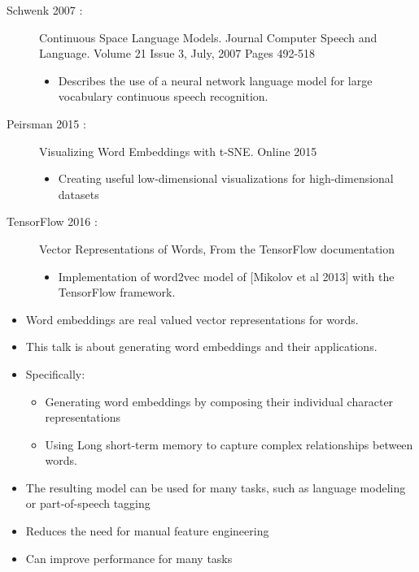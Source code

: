 \documentclass[11pt, a4paper, landscape]{article}
\begin{document}
\NewPage{} 
\vfill
\begin{description}

\item [Schwenk 2007 :] Continuous Space Language Models. Journal Computer Speech and Language. Volume 21 Issue 3, July, 2007 Pages 492-518 
  \begin{itemize}
  \item Describes the use of a neural network language model for large vocabulary continuous speech recognition.
  \end{itemize}

\item [Peirsman 2015 :] Visualizing Word Embeddings with t-SNE. Online 2015
  \begin{itemize}
  \item Creating useful low-dimensional visualizations for high-dimensional datasets
  \end{itemize}
  
\item [TensorFlow 2016 :] Vector Representations of Words, From the TensorFlow documentation
  \begin{itemize}
  \item Implementation of word2vec model of [Mikolov et al 2013] with the TensorFlow framework.
  \end{itemize}
\end{description}
\vfill


\NewPage{} 
\hypertarget{sli:introduction}{}

\vfill
\begin{itemize}
\item Word embeddings are real valued vector representations for words.
\item This talk is about generating word embeddings and their applications.
\item Specifically:
  \begin{itemize}
  \item Generating word embeddings by composing their individual character representations
  \item Using Long short-term memory to capture complex relationships between words.
\end{itemize}
\item The resulting model can be used for many tasks, such as language modeling or part-of-speech tagging
\item Reduces the need for manual feature engineering
\item Can improve performance for many tasks
\end{itemize}
\vfill
\end{document}
